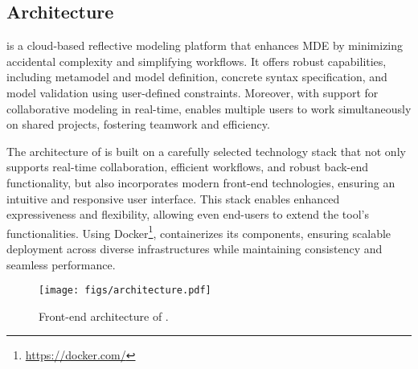 \subsection{\jjodel{} Architecture}\label{sec:architecture}
\jjodel{} is a cloud-based reflective modeling platform that enhances MDE by minimizing accidental complexity and simplifying workflows. It offers robust capabilities, including metamodel and model definition, concrete syntax specification, and model validation using user-defined constraints. Moreover, with support for collaborative modeling in real-time, \jjodel{} enables multiple users to work simultaneously on shared projects, fostering teamwork and efficiency.


The architecture of \jjodel{} is built on a carefully selected technology stack that not only supports real-time collaboration, efficient workflows, and robust back-end functionality, but also incorporates modern front-end technologies, ensuring an intuitive and responsive user interface. This stack enables enhanced expressiveness and flexibility, allowing even end-users to extend the tool’s functionalities. Using Docker\footnote{\url{https://docker.com/}}, \jjodel{} containerizes its components, ensuring scalable deployment across diverse infrastructures while maintaining consistency and seamless performance.

\begin{figure}
    \centering
\texttt{[image: figs/architecture.pdf]}
    \caption{Front-end architecture of \jjodel{}.}
    \label{fig:fe-architecture}
\end{figure}  


%
%
%

